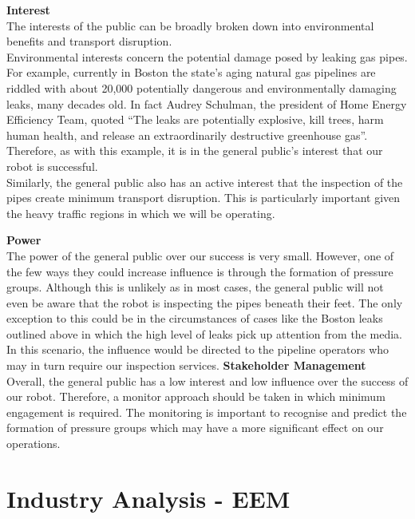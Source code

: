\documentclass[11pt]{article}		%
\begin{document}
			\textbf{Interest}\\
	        The interests of the public can be broadly broken down into environmental benefits and transport disruption.\\
		    \hspace*{3ex}Environmental interests concern the potential damage posed by leaking gas pipes. For example, currently in Boston the state’s aging natural gas pipelines are riddled with about 20,000 potentially dangerous and environmentally damaging leaks, many decades old. In fact Audrey Schulman, the president of Home Energy Efficiency Team, quoted  “The leaks are potentially explosive, kill trees, harm human health, and release an extraordinarily destructive greenhouse gas”. Therefore, as with this example, it is in the general public's interest that our robot is successful. \\
	        \hspace*{3ex}Similarly, the general public also has an active interest that the inspection of the pipes create minimum transport disruption. This is particularly important given the heavy traffic regions in which we will be operating. 
	        
	        \textbf{Power}\\
	        The power of the general public over our success is very small. However, one of the few ways they could increase influence is through the formation of pressure groups. Although this is unlikely as in most cases, the general public will not even be aware that the robot is inspecting the pipes beneath their feet. The only exception to this could be in the circumstances of cases like the Boston leaks outlined above in which the high level of leaks pick up attention from the media. In this scenario, the influence would be directed to the pipeline operators who may in turn require our inspection services.
	        \textbf{Stakeholder Management}\\
	        
	        Overall, the general public has a low interest and low influence over the success of our robot. Therefore, a monitor approach should be taken in which minimum engagement is required. The monitoring is important to recognise and predict the formation of pressure groups which may have a more significant effect on our operations. 
        
	\section{Industry Analysis - EEM}
		
\end{document}

